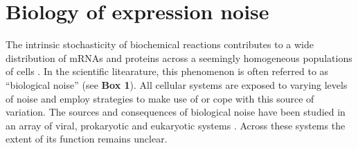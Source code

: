 
\section{Biology of expression noise} 

The intrinsic stochasticity of biochemical reactions contributes to a wide distribution of \glspl{mRNA} and proteins across a seemingly homogeneous populations of cells \citep{Elowitz2002}. 
In the scientific litearature, this phenomenon is often referred to as “biological noise” (see \textbf{Box 1}).
All cellular systems are exposed to varying levels of noise and employ strategies to make use of or cope with this source of variation. 
The sources and consequences of biological noise have been studied in an array of viral, prokaryotic and eukaryotic systems \citep{Raj2010, Balazsi2011, Eldar2010}. 
Across these systems the extent of its function remains unclear. 

